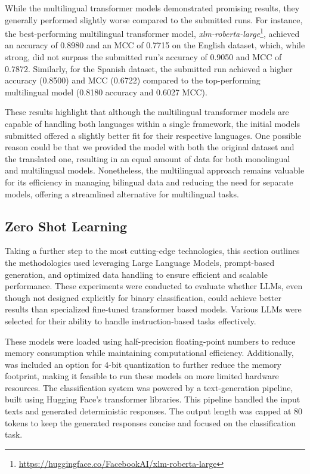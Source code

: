 \documentclass{Configuration_Files/PoliMi3i_thesis}
\begin{document}
While the multilingual transformer models demonstrated promising results, they generally performed slightly worse compared to the submitted runs. For instance, the best-performing multilingual transformer model, \textit{xlm-roberta-large}\footnote{\url{https://huggingface.co/FacebookAI/xlm-roberta-large}}, achieved an accuracy of 0.8980 and an MCC of 0.7715 on the English dataset, which, while strong, did not surpass the submitted run's accuracy of 0.9050 and MCC of 0.7872. Similarly, for the Spanish dataset, the submitted run achieved a higher accuracy (0.8500) and MCC (0.6722) compared to the top-performing multilingual model (0.8180 accuracy and 0.6027 MCC).

These results highlight that although the multilingual transformer models are capable of handling both languages within a single framework, the initial models submitted offered a slightly better fit for their respective languages. One possible reason could be that we provided the model with both the original dataset and the translated one, resulting in an equal amount of data for both monolingual and multilingual models. Nonetheless, the multilingual approach remains valuable for its efficiency in managing bilingual data and reducing the need for separate models, offering a streamlined alternative for multilingual tasks.

\subsection{Zero Shot Learning}
Taking a further step to the most cutting-edge technologies, this section outlines the methodologies used leveraging Large Language Models, prompt-based generation, and optimized data handling to ensure efficient and scalable performance. These experiments were conducted to evaluate whether LLMs, even though not designed explicitly for binary classification, could achieve better results than specialized fine-tuned transformer based models. Various LLMs were selected for their ability to handle instruction-based tasks effectively.

These models were loaded using half-precision floating-point numbers to reduce memory consumption while maintaining computational efficiency. Additionally, was included an option for 4-bit quantization to further reduce the memory footprint, making it feasible to run these models on more limited hardware resources. The classification system was powered by a text-generation pipeline, built using Hugging Face’s transformer libraries. This pipeline handled the input texts and generated deterministic responses. The output length was capped at 80 tokens to keep the generated responses concise and focused on the classification task. 
\end{document}
